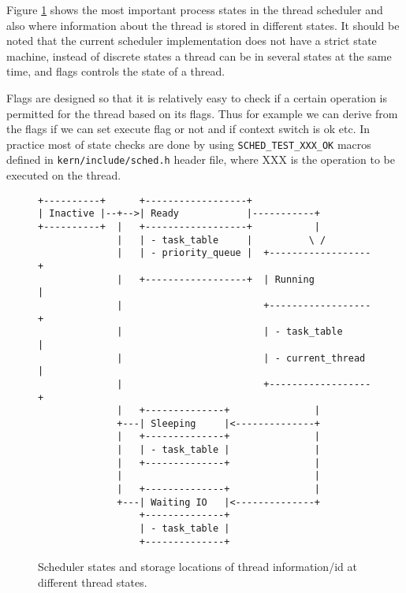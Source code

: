 Figure \ref{figure:thtree} shows the most important process states in the thread
scheduler and also where information about the thread is stored in different
states. It should be noted that the current scheduler implementation does not
have a strict state machine, instead of discrete states a thread can be in
several states at the same time, and flags controls the state of a thread.

Flags are designed so that it is relatively easy to check if a certain operation
is permitted for the thread based on its flags. Thus for example we can derive
from the flags if we can set execute flag or not and if context switch is ok
etc. In practice most of state checks are done by using \verb+SCHED_TEST_XXX_OK+
macros defined in \verb+kern/include/sched.h+ header file, where XXX is the
operation to be executed on the thread.

\begin{figure}
    \begin{verbatim}
+----------+      +------------------+
| Inactive |--+-->| Ready            |-----------+
+----------+  |   +------------------+           |
              |   | - task_table     |          \ /
              |   | - priority_queue |  +------------------+
              |   +------------------+  | Running          |
              |                         +------------------+
              |                         | - task_table     |
              |                         | - current_thread |
              |                         +------------------+
              |   +--------------+               |
              +---| Sleeping     |<--------------+
              |   +--------------+               |
              |   | - task_table |               |
              |   +--------------+               |
              |                                  |
              |   +--------------+               |
              +---| Waiting IO   |<--------------+
                  +--------------+
                  | - task_table |
                  +--------------+
    \end{verbatim}
    \caption{Scheduler states and storage locations of thread information/id at
             different thread states.}
    \label{figure:thtree}
\end{figure}
